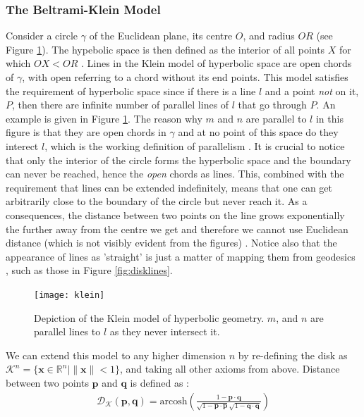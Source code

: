 \documentclass[12pt]{report}
\begin{document}
\subsubsection{The Beltrami-Klein Model}
Consider a circle $\gamma$ of the Euclidean plane, its centre $O$, and radius $OR$ (see Figure \ref{fig:klein}). The hypebolic space is then defined as the interior of all points $X$ for which $OX < OR$ \cite{Greenberg1994}. Lines in the Klein model of hyperbolic space are open chords of $\gamma$, with open referring to a chord without its end points. This model satisfies the requirement of hyperbolic space since if there is a line $l$ and a point \textit{not} on it, $P$, then there are infinite number of parallel lines of $l$ that go through $P$. An example is given in Figure \ref{fig:klein}. The reason why $m$ and $n$ are parallel to $l$ in this figure is that they are open chords in $\gamma$ and at no point of this space do they interect $l$, which is the working definition of parallelism \cite{Greenberg1994}. It is crucial to notice that only the interior of the circle forms the hyperbolic space and the boundary can never be reached, hence the \textit{open} chords as lines. This, combined with the requirement that lines can be extended indefinitely, means that one can get arbitrarily close to the boundary of the circle but never reach it. As a consequences, the distance between two points on the line grows exponentially the further away from the centre we get and therefore we cannot use Euclidean distance (which is not visibly evident from the figures) \cite{Greenberg1994}. Notice also that the appearance of lines as 'straight' is just a matter of mapping them from geodesics \cite{Greenberg1994}, such as those in Figure \ref{fig:disklines}. 

\begin{figure}
  \centering
	\texttt{[image: klein]}
	\caption{Depiction of the Klein model of hyperbolic geometry. $m$, and $n$ are parallel lines to $l$ as they never intersect it.}
	\label{fig:klein}
\end{figure}

We can extend this model to any higher dimension $n$ by re-defining the disk as $\mathcal{K}^n = \{\mathbf{x} \in \mathbb{R}^n | \lVert \mathbf{x} \rVert <1 \}$, and taking all other axioms from above. Distance between two points $\mathbf{p}$ and $\mathbf{q}$ is defined as \cite{Iversen1992}:
\begin{align}
  \mathcal{D_K}(\mathbf{p}, \mathbf{q}) = \text{arcosh} \left( \frac{1 - \mathbf{p} \cdot \mathbf{q}}{\sqrt{1-\mathbf{p}\cdot \mathbf{p}}\sqrt{1-\mathbf{q}\cdot \mathbf{q}}}   \right) 
\end{align}
\end{document}
